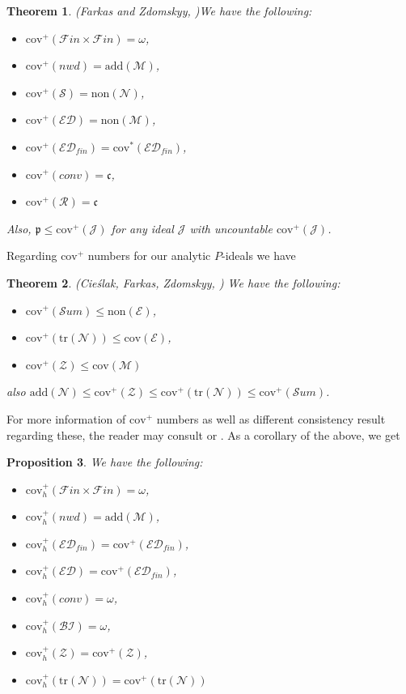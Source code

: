 \documentclass[a4paper]{amsart}
\newtheorem{theorem}{Theorem}[section]
\newtheorem{proposition}[theorem]{Proposition}
\newcommand{\ppp}{\mathfrak{p}}
\newcommand{\continuum}{\mathfrak{c}}
\newcommand{\Meager}{\mathcal{M}}
\newcommand{\Null}{\mathcal{N}}
\newcommand{\E}{\mathcal{E}}
\newcommand{\add}{\mathrm{add}}
\newcommand{\cov}{\mathrm{cov}}
\newcommand{\non}{\mathrm{non}}
\newcommand{\J}{\mathcal{J}}
\newcommand{\ED}{\mathcal{ED}}
\newcommand{\FF}{\mathcal{F}in\times\mathcal{F}in}
\newcommand{\nwd}{nwd}
\newcommand{\Z}{\mathcal{Z}}
\newcommand{\SUM}{\mathcal{S}um}
\newcommand{\conv}{conv}
\newcommand{\trN}{\mathrm{tr}(\Null)}
\newcommand{\BI}{\mathcal{BI}}
\begin{document}
\begin{theorem}(Farkas and Zdomskyy, \cite{FarkasZdomskyy})\label{FarkasZdomskyyOnCovPlus}
    We have the following:
    \begin{itemize}
        \item[--] $\cov^{+}(\FF)=\omega$,
        \item[--] $\cov^{+}(\nwd)=\add(\Meager)$,
        \item[--] $\cov^{+}(\mathcal{S})=\non(\Null)$,
        \item[--] $\cov^{+}(\ED)=\non(\Meager)$,
        \item[--] $\cov^{+}(\ED_{fin})=\cov^{*}(\ED_{fin})$,
        \item[--] $\cov^{+}(\conv)=\continuum$,
        \item[--] $\cov^{+}(\mathcal{R})=\continuum$
    \end{itemize}
    Also, $\ppp\leq\cov^{+}(\J)$ for any ideal $\J$ with uncountable $\cov^{+}(\J)$.
\end{theorem}
Regarding $\cov^{+}$ numbers for our analytic $P$-ideals we have
\begin{theorem}(Cieślak, Farkas, Zdomskyy, \cite{Killing_Ideals_Softly})
    We have the following:
    \begin{itemize}
        \item[--] $\cov^{+}(\SUM)\leq \non(\E)$,
        \item[--] $\cov^{+}(\trN)\leq\cov(\E)$,
        \item[--] $\cov^{+}(\Z)\leq\cov(\Meager)$
    \end{itemize}
    also $\add(\Null)\leq\cov^{+}(\Z)\leq\cov^{+}(\trN)\leq \cov^{+}(\SUM)$.
\end{theorem}
For more information of $\cov^{+}$ numbers as well as different consistency result regarding these, the reader may consult \cite{FarkasZdomskyy} or \cite{Killing_Ideals_Softly}. As a corollary of the above, we get
\begin{proposition}
    We have the following:
    \begin{itemize}
        \item[--] $\cov^{+}_{h}(\FF)=\omega$,
        \item[--] $\cov^{+}_{h}(\nwd)=\add(\Meager)$,
        \item[--] $\cov^{+}_{h}(\ED_{fin})=\cov^{+}(\ED_{fin})$,
        \item[--] $\cov^{+}_{h}(\ED)=\cov^{+}(\ED_{fin})$,
        \item[--] $\cov^{+}_{h}(\conv)=\omega$,
        \item[--] $\cov^{+}_{h}(\BI)=\omega$,
        \item[--] $\cov^{+}_{h}(\Z)=\cov^{+}(\Z)$,
        \item[--] $\cov^{+}_{h}(\trN)=\cov^{+}(\trN)$
    \end{itemize}
\end{proposition}
\end{document}

